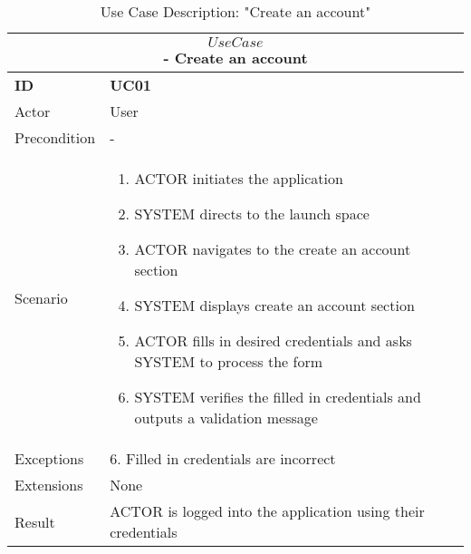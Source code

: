 \begin{center}
    \vspace{5mm}
    \begin{table}[H]
        \begin{tabular}{ |p{2cm}||p{11cm}| }
            \hline
            \multicolumn{2}{|c|}{$$Use Case$$ - Create an account} \\ \hline
            \textbf{ID} & \textbf{UC01} \\ \hline
            Actor & User \\ \hline
            Precondition & - \\ \hline
            Scenario &
            \begin{enumerate}
                \item ACTOR initiates the application
                \item SYSTEM directs to the launch space
                \item ACTOR navigates to the create an account section
                \item SYSTEM displays create an account section
                \item ACTOR fills in desired credentials and asks SYSTEM to process the form
                \item SYSTEM verifies the filled in credentials and outputs a validation message
            \end{enumerate}
            \\ \hline 
            Exceptions & 6. Filled in credentials are incorrect \\ \hline
            Extensions & None \\ \hline
            Result & ACTOR is logged into the application using their credentials \\ \hline
        \end{tabular}
        \caption{Use Case Description: "Create an account"}
    \end{table}


\end{center}
